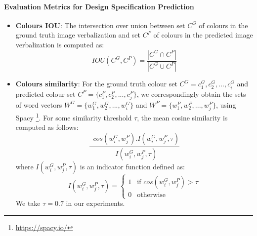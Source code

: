 \paragraph{Evaluation Metrics for Design Specification Prediction}
\label{sec:Evaluation Metrics}
\begin{itemize}
    \item \textbf{Colours IOU}: The intersection over union between set $C^G$ of colours in the ground truth image verbalization and set $C^P$ of colours in the predicted image verbalization is computed as:
    \begin{equation}
        IOU(C^G, C^P) = \frac{|C^G \cap C^P|}{|C^G \cup C^P|}
    \end{equation}
    \item \textbf{Colours similarity}: For the ground truth colour set $C^G = {c_1^G, c_2^G, ..., c_i^G}$ and predicted colour set $C^P = \{c_1^P, c_2^P, ..., c_j^P\}$, we correspondingly obtain the sets of word vectors $W^G = \{w_1^G, w_2^G, ..., w_i^G\}$ and $W^P = \{w_1^P, w_2^P, ..., w_j^P\}$, using Spacy \footnote{\url{https://spacy.io/}}. For some similarity threshold $\tau$, the mean cosine similarity is computed as follows:
    \begin{equation}
        \frac{\mathop{\sum_{i=1}^{|C^G|}\sum_{j=1}^{|C^P|}} cos(w_i^G, w_j^P).I(w_i^G, w_j^P, \tau)}{\mathop{\sum_{i=1}^{|C^G|}\sum_{j=1}^{|C^P|}} I(w_i^G, w_j^P, \tau) }
    \end{equation}
    where $I(w_i^G, w_j^P, \tau)$ is an indicator function defined as:
    \begin{equation}
        I(w_i^G, w_j^P, \tau) =
    \begin{cases}
        1 & \text{if } cos(w_i^G, w_j^P) > \tau\\
        0 & \text{otherwise}
    \end{cases}
    \end{equation}
    We take $\tau = 0.7$ in our experiments.
    

\end{itemize}
